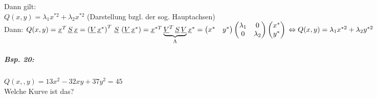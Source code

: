 \begin{enumerate}
Dann gilt:\\
$\boxed{Q(x,y)=\lambda_1x^{*2}+\lambda_2x^{*2}}$ (Darstellung bzgl. der sog. Hauptachsen)\\
Dann: $Q(x,y)=\underline{x}^T\, \underline{S}\, \underline{x}=\left(\underline{V}\, \underline{x}^*\right)^T \, \underline{S} \, \left( \underline{V} \, \underline{x}^*\right)=\underline{x}^{*T} \underbrace{\underline{V}^T\, \underline{S} \, \underline{V}}_{\Lambda}\underline{x}^*=\begin{pmatrix}
x^*&
y^*
\end{pmatrix} \begin{pmatrix}
\lambda_1 & 0 \\
0 & \lambda_2
\end{pmatrix}\begin{pmatrix}
x^*\\
y^*
\end{pmatrix}\\
\Leftrightarrow Q(x,y)= \lambda_1 x^{*2}+\lambda_2y^{*2}$
\end{enumerate}
\subparagraph{Bsp. 20:} \parskp
$Q(x,,y)=13x^2-32xy+37y^2=45$\\
Welche Kurve ist das?
